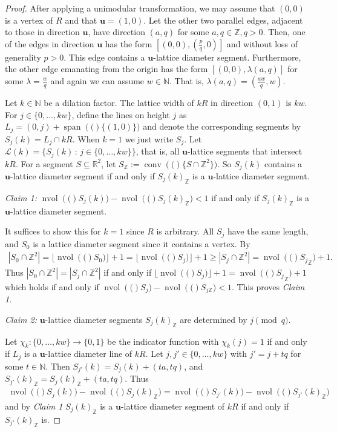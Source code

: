 \documentclass[10pt,a4paper]{amsart}
\newcommand{\Lcal}{\mathcal{L}}
\newcommand{\N}{\mathbb{N}}
\newcommand{\R}{\mathbb{R}}
\newcommand{\Z}{\mathbb{Z}}
\newcommand{\bu}{\mathbf{u}}
\newcommand{\conv}[1]{\operatorname{conv}\left(#1\right)}
\newcommand{\nvol}[1]{\operatorname{nvol}\left(#1\right)}
\newcommand{\spn}[1]{\operatorname{span}\left(#1\right)}
\newcommand{\st}{\, \mathrm{:}\,}
\begin{document}
\begin{proof}
    After applying a unimodular transformation, we may assume that $(0,0)$ is a vertex of $R$ and that $\bu = (1,0)$. Let the other two parallel edges, adjacent to those in direction $\bu$, have direction $(a,q)$ for some $a,q \in \Z, q >0$. Then, one of the edges in direction $\bu$ has the form $[(0,0),(\frac{p}{q},0)]$ and without loss of generality $p>0$. This edge contains a $\bu$-lattice diameter segment. Furthermore, the other edge emanating from the origin has the form $[(0,0),\lambda(a,q)]$ for some $\lambda = \frac{w}{q}$ and again we can assume $w \in \N$. That is, $\lambda(a,q) = (\frac{aw}{q},w)$.
    
    Let $k \in \N$ be a dilation factor. The lattice width of $kR$ in direction $(0,1)$ is $kw$.
    For $j \in \{0, \ldots, kw\}$, define the lines on height $j$ as $L_j = (0,j) + \spn(\{(1,0)\})$ and denote the corresponding segments by $S_j(k) = L_j \cap kR$. When $k=1$ we just write $S_j$. Let $\Lcal(k) = \{S_j(k) \st j \in \{0, \ldots, kw\}\}$, that is, all $\bu$-lattice segments that intersect $kR$. For a segment $S \subseteq \R^2$, let $S_{{\Z}} := \conv (\{S \cap \Z^2\})$. So $S_j(k)$ contains a $\bu$-lattice diameter segment if and only if $S_j(k)_{\Z}$ is a $\bu$-lattice diameter segment.

    \emph{Claim 1:} $\nvol(S_j(k))-\nvol(S_{j}(k)_{\Z}) <1$ if and only if $S_{j}(k)_\Z$ is a $\bu$-lattice diameter segment.
    
    It suffices to show this for $k=1$ since $R$ is arbitrary. All $S_j$ have the same length, and $S_0$ is a lattice diameter segment since it contains a vertex. By 
    \begin{align*}
        |S_0 \cap \Z^2| = \lfloor \nvol(S_0) \rfloor +1 
        = \lfloor \nvol(S_j) \rfloor +1  \geq |S_j \cap \Z^2| = \nvol({S_{j}}_{\Z}) +1.
    \end{align*}
    Thus $|S_0 \cap \Z^2| = |S_j \cap \Z^2|$ if and only if $\lfloor \nvol(S_j) \rfloor +1  = \nvol({S_{j}}_{\Z}) +1$ which holds if and only if $\nvol(S_j)- \nvol(S_{j{\Z}}) < 1$. This proves \textit{Claim 1}.


    \textit{Claim 2:} $\bu$-lattice diameter segments $S_j(k)_{\Z}$ are determined by $j \pmod q$. 
    
    Let $\chi_k: \{0, \ldots, kw\} \to \{0,1\}$ be the indicator function with $\chi_k(j)=1$ if and only if $L_j$ is a $\bu$-lattice diameter line of $kR$. Let $j,j' \in \{0, \ldots, kw\}$ with $j'= j+tq$ for some $t \in \N$. Then $S_{j'}(k) =S_j(k)+(ta,tq)$, and $S_{j'}(k)_\Z =S_j(k)_{\Z}+(ta,tq)$. Thus
    \begin{align*}
         \nvol(S_j(k))-\nvol(S_{j}(k)_{\Z})=\nvol(S_{j'}(k))-\nvol(S_{j'}(k)_{\Z})
    \end{align*}
    and by \textit{Claim 1} $S_j(k)_\Z$ is a $\bu$-lattice diameter segment of $kR$ if and only if $S_{j'}(k)_\Z$ is.
    

\end{proof}
\end{document}
